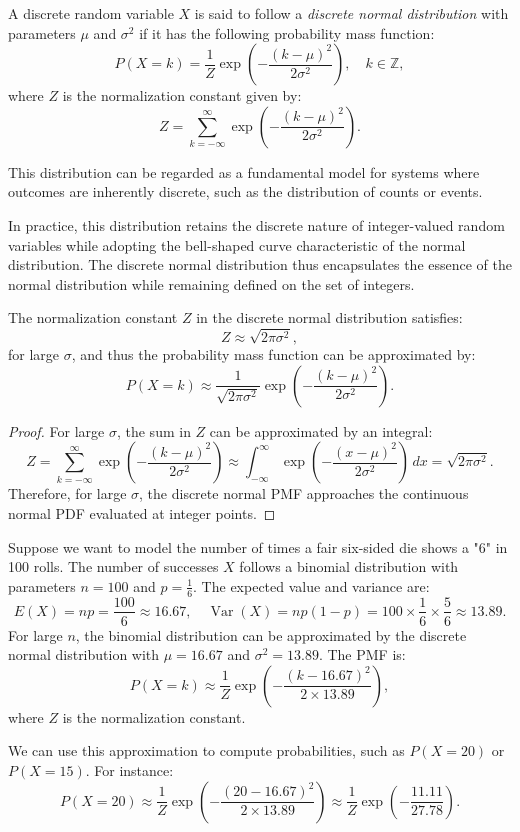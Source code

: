 \begin{definition}
A discrete random variable \( X \) is said to follow a \emph{discrete normal distribution} with parameters \( \mu \) and \( \sigma^2 \) if it has the following probability mass function:
\[
P(X = k) = \frac{1}{Z} \exp\left( -\frac{(k - \mu)^2}{2\sigma^2} \right), \quad k \in \mathbb{Z},
\]
where \( Z \) is the normalization constant given by:
\[
Z = \sum_{k = -\infty}^{\infty} \exp\left( -\frac{(k - \mu)^2}{2\sigma^2} \right).
\]
\end{definition}

This distribution can be regarded as a fundamental model for systems where outcomes are inherently discrete, such as the distribution of counts or events.

In practice, this distribution retains the discrete nature of integer-valued random variables while adopting the bell-shaped curve characteristic of the normal distribution. The discrete normal distribution thus encapsulates the essence of the normal distribution while remaining defined on the set of integers.

\begin{proposition}
The normalization constant \( Z \) in the discrete normal distribution satisfies:
\[
Z \approx \sqrt{2\pi \sigma^2},
\]
for large \( \sigma \), and thus the probability mass function can be approximated by:
\[
P(X = k) \approx \frac{1}{\sqrt{2\pi \sigma^2}} \exp\left( -\frac{(k - \mu)^2}{2\sigma^2} \right).
\]
\end{proposition}
\begin{proof}
For large \( \sigma \), the sum in \( Z \) can be approximated by an integral:
\[
Z = \sum_{k = -\infty}^{\infty} \exp\left( -\frac{(k - \mu)^2}{2\sigma^2} \right) \approx \int_{-\infty}^{\infty} \exp\left( -\frac{(x - \mu)^2}{2\sigma^2} \right) \, dx = \sqrt{2\pi \sigma^2}.
\]
Therefore, for large \( \sigma \), the discrete normal PMF approaches the continuous normal PDF evaluated at integer points.
\end{proof}

\begin{example}
Suppose we want to model the number of times a fair six-sided die shows a "6" in 100 rolls. The number of successes \( X \) follows a binomial distribution with parameters \( n = 100 \) and \( p = \frac{1}{6} \). The expected value and variance are:
\[
E(X) = np = \frac{100}{6} \approx 16.67, \quad \operatorname{Var}(X) = np(1 - p) = 100 \times \frac{1}{6} \times \frac{5}{6} \approx 13.89.
\]
For large \( n \), the binomial distribution can be approximated by the discrete normal distribution with \( \mu = 16.67 \) and \( \sigma^2 = 13.89 \). The PMF is:
\[
P(X = k) \approx \frac{1}{Z} \exp\left( -\frac{(k - 16.67)^2}{2 \times 13.89} \right),
\]
where \( Z \) is the normalization constant.

We can use this approximation to compute probabilities, such as \( P(X = 20) \) or \( P(X = 15) \). For instance:
\[
P(X = 20) \approx \frac{1}{Z} \exp\left( -\frac{(20 - 16.67)^2}{2 \times 13.89} \right) \approx \frac{1}{Z} \exp\left( -\frac{11.11}{27.78} \right).
\]
\end{example}


